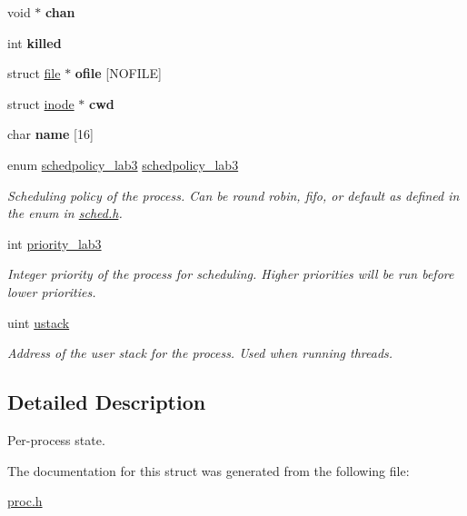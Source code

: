 \begin{DoxyCompactItemize}
void $\ast$ {\bfseries chan}
\item 
\mbox{\label{structproc_afb4f94a3f4df9a835dbb41b0c26660a4}} 
int {\bfseries killed}
\item 
\mbox{\label{structproc_a4a9eb0352efe3fc097c91fccfaac50bd}} 
struct \mbox{\hyperlink{structfile}{file}} $\ast$ {\bfseries ofile} \mbox{[}N\+O\+F\+I\+LE\mbox{]}
\item 
\mbox{\label{structproc_a493bc338ce008a838eef521972a35257}} 
struct \mbox{\hyperlink{structinode}{inode}} $\ast$ {\bfseries cwd}
\item 
\mbox{\label{structproc_ac04af53e17d24b90c3cbfab56d658d62}} 
char {\bfseries name} \mbox{[}16\mbox{]}
\item 
\mbox{\label{structproc_a0ffe0394d8404f50596733058d8069b8}} 
enum \mbox{\hyperlink{sched_8h_a535556cdcf29b612499f57b24c963364}{schedpolicy\+\_\+lab3}} \mbox{\hyperlink{structproc_a0ffe0394d8404f50596733058d8069b8}{schedpolicy\+\_\+lab3}}
\begin{DoxyCompactList}\small\item\em Scheduling policy of the process. Can be round robin, fifo, or default as defined in the enum in \mbox{\hyperlink{sched_8h}{sched.\+h}}. \end{DoxyCompactList}\item 
\mbox{\label{structproc_aa323a7bacc088f7042a7b015080fc8f6}} 
int \mbox{\hyperlink{structproc_aa323a7bacc088f7042a7b015080fc8f6}{priority\+\_\+lab3}}
\begin{DoxyCompactList}\small\item\em Integer priority of the process for scheduling. Higher priorities will be run before lower priorities. \end{DoxyCompactList}\item 
\mbox{\label{structproc_a4722b3b20db1b92dab48e1fb55161616}} 
uint \mbox{\hyperlink{structproc_a4722b3b20db1b92dab48e1fb55161616}{ustack}}
\begin{DoxyCompactList}\small\item\em Address of the user stack for the process. Used when running threads. \end{DoxyCompactList}\end{DoxyCompactItemize}


\subsection{Detailed Description}
Per-\/process state. 

The documentation for this struct was generated from the following file\+:\begin{DoxyCompactItemize}
\item 
\mbox{\hyperlink{proc_8h}{proc.\+h}}\end{DoxyCompactItemize}
